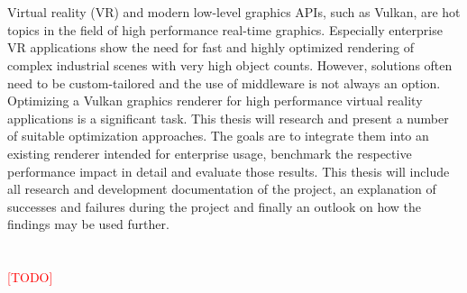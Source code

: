 \chapter{\abstractname}

Virtual reality (VR) and modern low-level graphics APIs, such as Vulkan, are hot topics in the field of high performance real-time graphics. Especially enterprise VR applications show the need for fast and highly optimized rendering of complex industrial scenes with very high object counts. However, solutions often need to be custom-tailored and the use of middleware is not always an option. Optimizing a Vulkan graphics renderer for high performance virtual reality applications is a significant task. This thesis will research and present a number of suitable optimization approaches. The goals are to integrate them into an existing renderer intended for enterprise usage, benchmark the respective performance impact in detail and evaluate those results. This thesis will include all research and development documentation of the project, an explanation of successes and failures during the project and finally an outlook on how the findings may be used further.  





\makeatletter
{}
{\renewcommand{\abstractname}{Kurzfassung}}
{\renewcommand{\abstractname}{Abstract}}
\makeatother

\chapter{\abstractname}

\begin{otherlanguage}{ngerman} %
\textcolor{red}{[TODO]}
\end{otherlanguage}


\makeatletter
{}
{\renewcommand{\abstractname}{Abstract}}
{\renewcommand{\abstractname}{Kurzfassung}}
\makeatother
